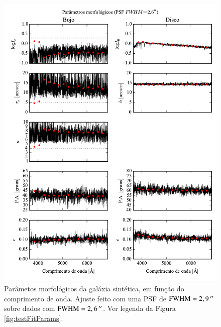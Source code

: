 \begin{figure}
	\includegraphics{figuras/simulation_fitparams_psf26}
	\caption[Parâmetos morfológicos (teste com PSF $\mathrm{FWHM} = 2,6\,\arcs$).]
	{Parâmetos morfológicos da galáxia sintética, em função do comprimento de
	onda. Ajuste feito com uma PSF de $\mathrm{FWHM} = 2,9\,^{\prime\prime}$ sobre
	dados com $\mathrm{FWHM} = 2,6\,\arcs$. Ver legenda da Figura
	\ref{fig:testFitParams}.}
	\label{fig:testFitParams26}
\end{figure}

